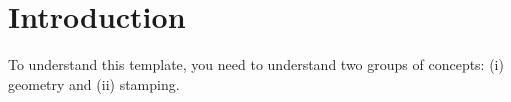 \documentclass[UTF8,11pt,twoside]{ctexart}
\begin{document}
\section{Introduction}

To understand this template, you need to understand two groups of concepts: (i)
geometry and (ii) stamping.


\end{document}
